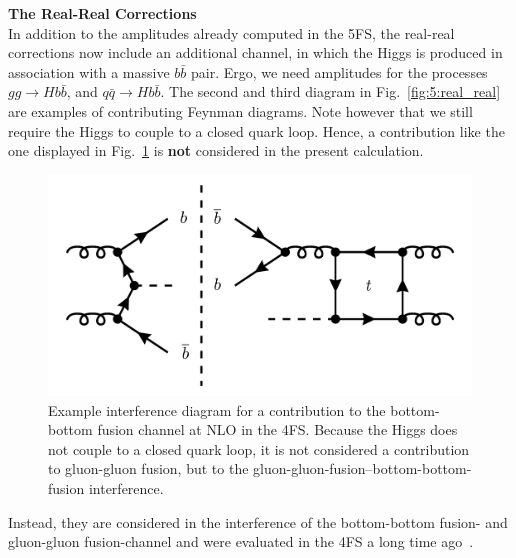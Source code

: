\textbf{The Real-Real Corrections} \\
In addition to the amplitudes already computed in the 5\acs{FS}, the real-real corrections now include an additional channel, in which the Higgs is produced in association with a massive $b \bar{b}$ pair. Ergo, we need amplitudes for the processes $gg \longrightarrow H b \bar{b}$, and $q \bar{q} \longrightarrow H b \bar{b}$. The second and third diagram in Fig.~\ref{fig:5:real_real} are examples of contributing Feynman diagrams. Note however that we still require the Higgs to couple to a closed quark loop. Hence, a contribution like the one displayed in Fig.~\ref{fig:5:ggH_bbH_interference} is \textbf{not} considered in the present calculation.
\begin{figure}[h]
\centering
\includegraphics[scale=0.3]{Images/NNLO_Feynman_diagrams/interference_with_bbH.pdf}
\caption{Example interference diagram for a contribution to the bottom-bottom fusion channel at \acs{NLO} in the 4\acs{FS}. Because the Higgs does not couple to a closed quark loop, it is not considered a contribution to gluon-gluon fusion, but to the gluon-gluon-fusion--bottom-bottom-fusion interference.}
\label{fig:5:ggH_bbH_interference}
\end{figure}
Instead, they are considered in the interference of the bottom-bottom fusion- and gluon-gluon fusion-channel and were evaluated in the 4\acs{FS} a long time ago~\cite{Dittmaier:2003ej}.

